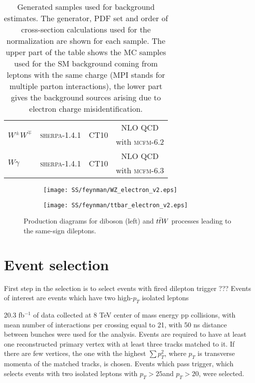 \begin{table}[ht]
\begin{center}
\begin{tabular}{l|c|c|c}
\multirow{2}{*}{$W^{\pm}W^{\mp}$} & \multirow{2}{*}{{\scshape sherpa-1.4.1}} & \multirow{2}{*}{CT10}& NLO QCD \\
& &  & with {\scshape mcfm-6.2}\\
\hline
\multirow{2}{*}{$W\gamma$} & \multirow{2}{*}{{\scshape sherpa}-1.4.1} & \multirow{2}{*}{CT10}& NLO QCD\\
& &  & with {\scshape mcfm-6.3}\\
\hline
\end{tabular}
\end{center}
  \caption{Generated samples used for background estimates. The generator, PDF set and order of cross-section calculations used for the normalization
  are shown for each sample.
  The upper part of the table shows the MC samples used for the SM background coming from leptons with the same charge (MPI stands for multiple parton interactions), the lower part gives the background sources arising due to electron charge misidentification.}
\label{tab:MC_cross}
\end{table}

\begin{figure}

\begin{subfigure}{.5\textwidth}
  \centering
  \texttt{[image: SS/feynman/WZ\_electron\_v2.eps]}
\end{subfigure}%
\begin{subfigure}{.5\textwidth}
  \centering
  \texttt{[image: SS/feynman/ttbar\_electron\_v2.eps]}
\end{subfigure}

\caption{Production diagrams for diboson (left) and $t\bar{t} W$ processes leading to the same-sign dileptons.}
  \label{fig:prompt_bkg_feynman_diag}
\end{figure}


\section{Event selection}

First step in the selection is to select events with fired dilepton trigger ???
Events of interest are events which have two high-$p_T$ isolated leptons \toFix

20.3 fb$^{-1}$ of data collected at 8 TeV center of mass energy pp collisions, with mean number of interactions per crossing equal to 21, 
with 50 ns distance between bunches were used for the analysis.
Events are required to have at least one reconstructed primary vertex with at least three tracks matched to it. If there are few vertices, the one with the highest
$\sum p^2_T$, where $p_T$ is transverse momenta of the matched tracks, is chosen.
Events which pass \toFix trigger, which selects events with two isolated \toFix leptons with $p_{T}>25$\toFix and $p_{T}>20$\toFix, were selected.

